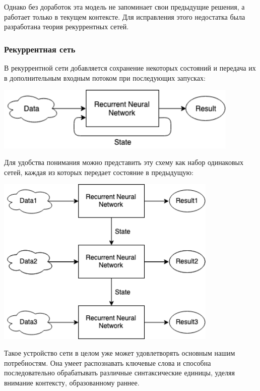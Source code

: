 Однако без доработок эта модель не запоминает свои предыдущие решения, а работает только в текущем контексте. Для исправления этого недостатка была разработана теория рекуррентных сетей.


\subsubsection{Рекуррентная сеть}

В рекуррентной сети добавляется сохранение некоторых состояний и передача их в дополнительным входным потоком при последующих запусках: 

\begin{center} \includegraphics[width=330pt]{images/model_schema_4.png} \end{center}

Для удобства понимания можно представить эту схему как набор одинаковых сетей, каждая из которых передает состояние в предыдущую:

\begin{center} \includegraphics[width=300pt]{images/model_schema_5.png} \end{center}

Такое устройство сети в целом уже может удовлетворять основным нашим потребностям. Она умеет распознавать ключевые слова и способна последовательно обрабатывать различные синтаксические единицы, уделяя внимание контексту, образованному раннее.

